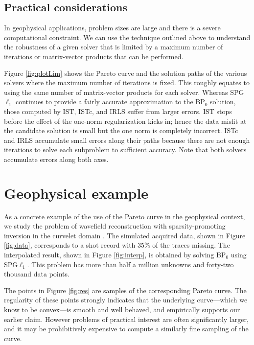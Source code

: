 \subsection{Practical considerations}
%
\mbox{}\indent In geophysical applications, problem sizes are large
and there is a severe computational constraint. We can use the
technique outlined above to understand the robustness of a given
solver that is limited by a maximum number of iterations or
matrix-vector products that can be performed.

Figure \ref{fig:plotLim} shows the Pareto curve and the solution
paths of the various solvers where the maximum number of iterations is
fixed. This roughly equates to using the same number of matrix-vector
products for each solver. Whereas SPG$\ell_1$ continues to provide a
fairly accurate approximation to the BP$_0$ solution, those computed
by IST, ISTc, and IRLS suffer from larger errors. IST stops before the
effect of the one-norm regularization kicks in; hence the data misfit
at the candidate solution is small but the one norm is completely
incorrect. ISTc and IRLS accumulate small errors along their paths
because there are not enough iterations to solve each subproblem to
sufficient accuracy. Note that both solvers accumulate errors along
both axes.
%
%
\section{Geophysical example}

\mbox{}\indent As a concrete example of the use of the Pareto curve in
the geophysical context, we study the problem of wavefield
reconstruction with sparsity-promoting inversion in the curvelet
domain \cite[CRSI -][]{herrmann07crsi}. The simulated acquired data,
shown in Figure \ref{fig:data}, corresponds to a shot record with 35\%
of the traces missing. The interpolated result, shown in Figure
\ref{fig:interp}, is obtained by solving BP$_0$ using SPG$\ell_1$.
This problem has more than half a million unknowns and forty-two
thousand data points.

The points in Figure \ref{fig:res} are samples of the corresponding
Pareto curve.  The regularity of these points strongly indicates that
the underlying curve---which we know to be convex---is smooth and well
behaved, and empirically supports our earlier claim.  However problems
of practical interest are often significantly larger, and it may be
prohibitively expensive to compute a similarly fine sampling of the
curve.

